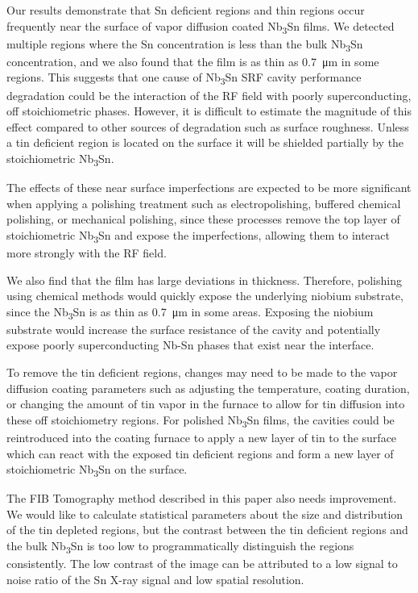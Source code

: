 Our results demonstrate that Sn deficient regions and thin regions occur frequently near the surface of vapor diffusion coated Nb\textsubscript{3}Sn films. We detected multiple regions where the Sn concentration is less than the bulk Nb\textsubscript{3}Sn concentration, and we also found that the film is as thin as \qty{0.7}{\micro\meter} in some regions. This suggests that one cause of Nb\textsubscript{3}Sn SRF cavity performance degradation could be the interaction of the RF field with poorly superconducting, off stoichiometric phases. However, it is difficult to estimate the magnitude of this effect compared to other sources of degradation such as surface roughness. Unless a tin deficient region is located on the surface it will be shielded partially by the stoichiometric Nb\textsubscript{3}Sn. 

The effects of these near surface imperfections are expected to be more significant when applying a polishing treatment such as electropolishing, buffered chemical polishing, or mechanical polishing, since these processes remove the top layer of stoichiometric Nb\textsubscript{3}Sn and expose the imperfections, allowing them to interact more strongly with the RF field. 

We also find that the film has large deviations in thickness. Therefore, polishing using chemical methods would quickly expose the underlying niobium substrate, since the Nb\textsubscript{3}Sn is as thin as \qty{0.7}{\micro\meter} in some areas. Exposing the niobium substrate would increase the surface resistance of the cavity and potentially expose poorly superconducting Nb-Sn phases that exist near the interface\cite{lee2018atomic}.

To remove the tin deficient regions, changes may need to be made to the vapor diffusion coating parameters such as adjusting the temperature, coating duration, or changing the amount of tin vapor in the furnace to allow for tin diffusion into these off stoichiometry regions. For polished Nb\textsubscript{3}Sn films, the cavities could be reintroduced into the coating furnace to apply a new layer of tin to the surface which can react with the exposed tin deficient regions and form a new layer of stoichiometric Nb\textsubscript{3}Sn on the surface.

The FIB Tomography method described in this paper also needs improvement. We would like to calculate statistical parameters about the size and distribution of the tin depleted regions, but the contrast between the tin deficient regions and the bulk Nb\textsubscript{3}Sn is too low to programmatically distinguish the regions consistently. The low contrast of the image can be attributed to a low signal to noise ratio of the Sn X-ray signal and low spatial resolution.


